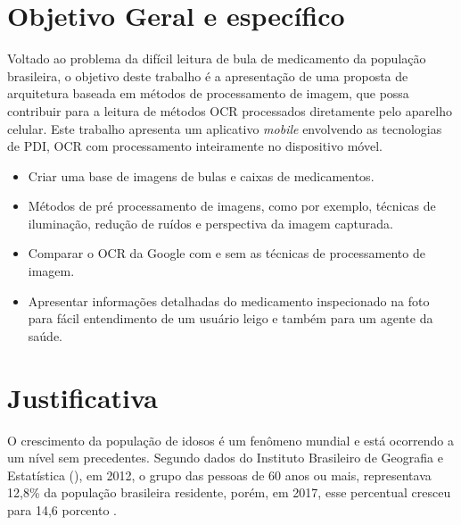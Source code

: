 \section{Objetivo Geral e específico}
Voltado ao problema da difícil leitura de bula  de medicamento da população brasileira, o objetivo deste trabalho é a apresentação de uma proposta de arquitetura baseada em métodos de processamento de imagem, que possa contribuir para a leitura de métodos  OCR processados diretamente pelo aparelho celular.
 Este trabalho apresenta um aplicativo \textit{mobile} envolvendo as tecnologias de PDI, OCR com processamento inteiramente no dispositivo móvel. 

\begin{itemize}
  \item Criar uma base de imagens de bulas e caixas de medicamentos.
  \item Métodos de pré processamento de imagens, como por exemplo, técnicas de iluminação, redução de ruídos e perspectiva da imagem capturada.
  \item Comparar o OCR da Google com e sem as técnicas de processamento de imagem.
  \item Apresentar informações detalhadas do medicamento inspecionado na foto para fácil entendimento de um usuário leigo e também para um agente da saúde.
\end{itemize}



\section{Justificativa}
O crescimento da população de idosos é um fenômeno mundial e está ocorrendo a um nível sem precedentes. Segundo dados do Instituto Brasileiro de Geografia e Estatística (), em 2012, o grupo das pessoas de 60 anos ou mais, representava 12,8\% da população brasileira residente, porém, em 2017, esse percentual cresceu para 14,6 porcento \cite{jornaldocomercio1}.


